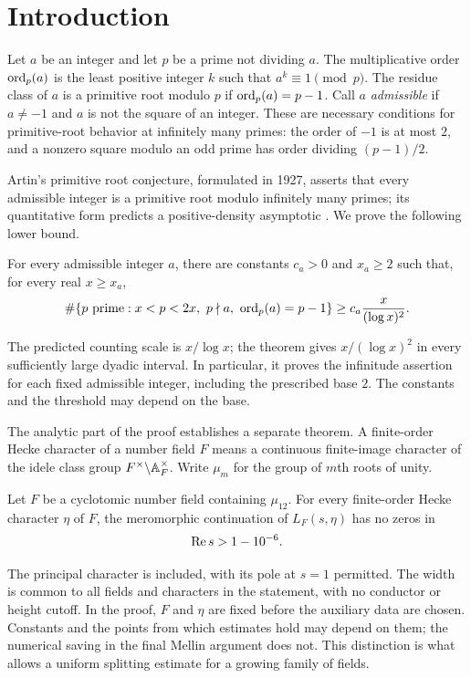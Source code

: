 \section{Introduction}\label{sec:introduction}

Let $a$ be an integer and let $p$ be a prime not dividing $a$.
The multiplicative order $\operatorname{ord}_p(a)$ is the least positive integer $k$
such that $a^k\equiv1\pmod p$. The residue class of $a$ is a primitive
root modulo $p$ if $\operatorname{ord}_p(a)=p-1$. Call $a$ \emph{admissible} if
$a\ne-1$ and $a$ is not the square of an integer. These are necessary
conditions for primitive-root behavior at infinitely many primes:
the order of $-1$ is at most $2$, and a nonzero square modulo an odd
prime has order dividing $(p-1)/2$.

Artin's primitive root conjecture, formulated in 1927, asserts that
every admissible integer is a primitive root modulo infinitely many
primes; its quantitative form predicts a positive-density asymptotic
\cite[Section~17.2]{ArtinHasse08}. We prove the following lower bound.

\begin{theorem}\label{thm:primitive-root}\label{thm:main}
For every admissible integer $a$, there are constants $c_a>0$ and
$x_a\ge2$ such that, for every real $x\ge x_a$,
\[
 \#\{p\text{ prime}:x<p<2x,\ p\nmid a,\ \operatorname{ord}_p(a)=p-1\}
       \ge c_a\frac{x}{(\log x)^2}.
\]
\end{theorem}

The predicted counting scale is $x/\log x$; the theorem gives
$x/(\log x)^2$ in every sufficiently large dyadic interval. In
particular, it proves the infinitude assertion for each fixed
admissible integer, including the prescribed base $2$. The constants
and the threshold may depend on the base.

The analytic part of the proof establishes a separate theorem.
A finite-order Hecke character of a number field $F$ means a continuous
finite-image character of the idele class group
$F^\times\backslash\mathbb{A}_F^\times$. Write $\mu_m$ for the group of
$m$th roots of unity.

\begin{theorem}\label{thm:hecke-zero-free}
Let $F$ be a cyclotomic number field containing $\mu_{12}$.
For every finite-order Hecke character $\eta$ of $F$, the meromorphic
continuation of $L_F(s,\eta)$ has no zeros in
\[
 \operatorname{Re} s>1-10^{-6}.
\]
\end{theorem}

The principal character is included, with its pole at $s=1$ permitted.
The width is common to all fields and characters in the statement,
with no conductor or height cutoff. In the proof, $F$ and $\eta$ are
fixed before the auxiliary data are chosen. Constants and the points
from which estimates hold may depend on them; the numerical saving
in the final Mellin argument does not. This distinction is what
allows a uniform splitting estimate for a growing family of fields.

